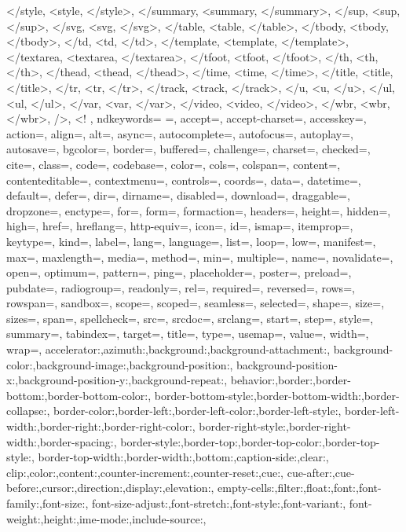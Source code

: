 {{		</style, <style, </style>,
		</summary, <summary, </summary>,
		</sup, <sup, </sup>,
		</svg, <svg, </svg>,
		</table, <table, </table>,
		</tbody, <tbody, </tbody>,
		</td, <td, </td>,
		</template, <template, </template>,
		</textarea, <textarea, </textarea>,
		</tfoot, <tfoot, </tfoot>,
		</th, <th, </th>,
		</thead, <thead, </thead>,
		</time, <time, </time>,
		</title, <title, </title>,
		</tr, <tr, </tr>,
		</track, <track, </track>,
		</u, <u, </u>,
		</ul, <ul, </ul>,
		</var, <var, </var>,
		</video, <video, </video>,
		</wbr, <wbr, </wbr>,
		/>, <!
	},  
	ndkeywords={
		=,
		accept=, accept-charset=, accesskey=, action=, align=, alt=, async=, autocomplete=, autofocus=, autoplay=, autosave=, bgcolor=, border=, buffered=, challenge=, charset=, checked=, cite=, class=, code=, codebase=, color=, cols=, colspan=, content=, contenteditable=, contextmenu=, controls=, coords=, data=, datetime=, default=, defer=, dir=, dirname=, disabled=, download=, draggable=, dropzone=, enctype=, for=, form=, formaction=, headers=, height=, hidden=, high=, href=, hreflang=, http-equiv=, icon=, id=, ismap=, itemprop=, keytype=, kind=, label=, lang=, language=, list=, loop=, low=, manifest=, max=, maxlength=, media=, method=, min=, multiple=, name=, novalidate=, open=, optimum=, pattern=, ping=, placeholder=, poster=, preload=, pubdate=, radiogroup=, readonly=, rel=, required=, reversed=, rows=, rowspan=, sandbox=, scope=, scoped=, seamless=, selected=, shape=, size=, sizes=, span=, spellcheck=, src=, srcdoc=, srclang=, start=, step=, style=, summary=, tabindex=, target=, title=, type=, usemap=, value=, width=, wrap=,
		accelerator:,azimuth:,background:,background-attachment:,
		background-color:,background-image:,background-position:,
		background-position-x:,background-position-y:,background-repeat:,
		behavior:,border:,border-bottom:,border-bottom-color:,
		border-bottom-style:,border-bottom-width:,border-collapse:,
		border-color:,border-left:,border-left-color:,border-left-style:,
		border-left-width:,border-right:,border-right-color:,
		border-right-style:,border-right-width:,border-spacing:,
		border-style:,border-top:,border-top-color:,border-top-style:,
		border-top-width:,border-width:,bottom:,caption-side:,clear:,
		clip:,color:,content:,counter-increment:,counter-reset:,cue:,
		cue-after:,cue-before:,cursor:,direction:,display:,elevation:,
		empty-cells:,filter:,float:,font:,font-family:,font-size:,
		font-size-adjust:,font-stretch:,font-style:,font-variant:,
		font-weight:,height:,ime-mode:,include-source:,
}}
